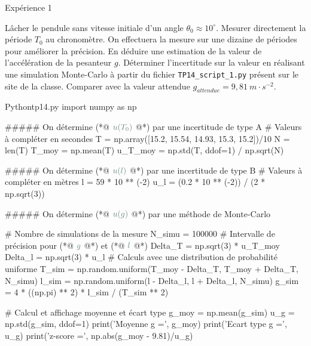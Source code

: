 \documentclass[a4paper,french,bookmarks]{article}
\begin{document}
\begin{form}{Expérience 1}{}
    \begin{center}
    \end{center}
    \begin{enumerate}
        \ithand Lâcher le pendule sans vitesse initiale d’un angle $\theta_0 \approx 10^\circ$.
        \ithand Mesurer directement la période $T_0$ au chronomètre. On effectuera la mesure sur une dizaine de périodes pour améliorer la précision.
        \ithand En déduire une estimation de la valeur de l’accélération de la pesanteur $g$. Déterminer l’incertitude sur la valeur en réalisant une simulation Monte-Carlo à partir du fichier \verb|TP14_script_1.py| présent sur le site de la classe. Comparer avec la valeur attendue $g_{attendue} = 9,81 \ m \cdot s^{-2}$.
    \end{enumerate}
\end{form}
\begin{code}{Python}{tp14.py}
import numpy as np

##### On détermine (*@ $\codecom u(T_0)$ @*) par une incertitude de type A
# Valeurs à compléter en secondes
T = np.array([15.2, 15.54, 14.93, 15.3, 15.2])/10
N = len(T)
T_moy = np.mean(T)
u_T_moy = np.std(T, ddof=1) / np.sqrt(N)

##### On détermine (*@ $\codecom u(l)$ @*) par une incertitude de type B
# Valeurs à compléter en mètres
l = 59 * 10 ** (-2)
u_l = (0.2 * 10 ** (-2)) / (2 * np.sqrt(3))

##### On détermine (*@ $\codecom u(g)$ @*) par une méthode de Monte-Carlo

# Nombre de simulations de la mesure
N_simu = 100000
# Intervalle de précision pour (*@ $\codecom g$ @*) et (*@ $\codecom l$ @*)
Delta_T = np.sqrt(3) * u_T_moy
Delta_l = np.sqrt(3) * u_l
# Calculs avec une distribution de probabilité uniforme
T_sim = np.random.uniform(T_moy - Delta_T, T_moy + Delta_T, N_simu)
l_sim = np.random.uniform(l - Delta_l, l + Delta_l, N_simu)
g_sim = 4 * ((np.pi) ** 2) * l_sim / (T_sim ** 2)

# Calcul et affichage moyenne et écart type
g_moy = np.mean(g_sim)
u_g = np.std(g_sim, ddof=1)
print('Moyenne g =', g_moy)
print('Ecart type g =', u_g)
print('z-score =', np.abs(g_moy - 9.81)/u_g)
\end{code}
\end{document}
